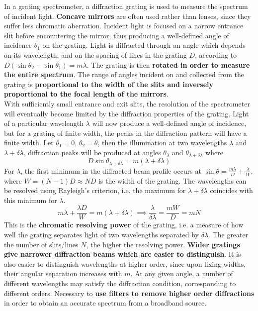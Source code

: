 \documentclass[a4paper]{article}
\begin{document}
\begin{Note}[Spectrometer]
In a grating spectrometer, a diffraction grating is used to measure the spectrum of incident light. \textbf{Concave mirrors} are often used rather than lenses, since they suffer less chromatic aberration. Incident light is focused on a narrow entrance slit before encountering the mirror, thus producing a well-defined angle of incidence $\theta_1$ on the grating. Light is diffracted through an angle which depends on its wavelength, and on the spacing of lines in the grating $D$, according to $D(\sin\theta_2-\sin\theta_1)=m\lambda$. The grating is then \textbf{rotated in order to measure the entire spectrum}. The range of angles incident on and collected from the grating is \textbf{proportional to the width of the slits and inversely proportional to the focal length of the mirrors}.\\[5pt]
With sufficiently small entrance and exit slits, the resolution of the spectrometer will eventually become limited by the diffraction properties of the grating. Light of a particular wavelength $\lambda$ will now produce a well-defined angle of incidence, but for a grating of finite width, the peaks in the diffraction pattern will have a finite width. Let $\theta_1=0$, $\theta_2=\theta$, then the illumination at two wavelengths $\lambda$ and $\lambda+\delta\lambda$, diffraction peaks will be produced at angles $\theta_\lambda$ and $\theta_{\lambda+\delta\lambda}$ where
$$D\sin\theta_{\lambda+\delta\lambda}=m(\lambda+\delta\lambda)$$
For $\lambda$, the first minimum in the diffracted beam profile occurs at $\sin\theta=\frac{m\lambda}{D}+\frac{\lambda}{W}$, where $W=(N-1)D\approx ND$ is the width of the grating. The wavelengths can be resolved using Rayleigh's criterion, i.e. the maximum for $\lambda+\delta\lambda$ coincides with this minimum for $\lambda$.
$$m\lambda+\frac{\lambda D}{W}=m(\lambda+\delta\lambda)\implies\frac{\lambda}{\delta\lambda}=\frac{mW}{D}=mN$$
This is the \textbf{chromatic resolving power} of the grating, i.e. a measure of how well the grating separates light of two wavelengths separated by $\delta\lambda$. The greater the number of slits/lines $N$, the higher the resolving power. \textbf{Wider gratings give narrower diffraction beams which are easier to distinguish}. It is also easier to distinguish wavelengths at higher order, since upon fixing widths, their angular separation increases with $m$. At any given angle, a number of different wavelengths may satisfy the diffraction condition, corresponding to different orders. Necessary to \textbf{use filters to remove higher order diffractions} in order to obtain an accurate spectrum from a broadband source.
\end{Note}
\end{document}

